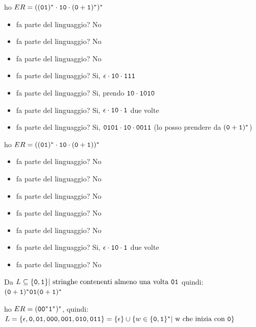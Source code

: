 \begin{example}
	ho $ER=((\mathtt{0}\mathtt{1})^*\cdot \mathtt{1}\mathtt{0}\cdot (\mathtt{0}+\mathtt{1})^*)^*$
	\begin{itemize}
		\item \zero\uno\zero\uno fa parte del linguaggio? No
		\item \zero\uno\zero\zero\zero fa parte del linguaggio? No
		\item \zero\uno\zero\uno\uno fa parte del linguaggio? No
		\item \uno\zero\uno\uno\uno fa parte del linguaggio? Si, $\epsilon\cdot \mathtt{1}\mathtt{0}\cdot \mathtt{1}\mathtt{1}\mathtt{1}$
		\item \uno\zero\uno\zero\uno\zero fa parte del linguaggio? Si, prendo $\mathtt{1}\mathtt{0}\cdot \mathtt{1}\mathtt{0}\mathtt{1}\mathtt{0}$
		\item \uno\zero\uno\uno\zero\uno fa parte del linguaggio? Si, $\epsilon\cdot \mathtt{1}\mathtt{0}\cdot \mathtt{1}$ due volte
		\item \zero\uno\zero\uno\uno\zero\zero\zero\uno\uno fa parte del linguaggio? Si, $\mathtt{0}\mathtt{1}\mathtt{0}\mathtt{1}\cdot \mathtt{1}\mathtt{0}\cdot \mathtt{0}\mathtt{0}\mathtt{1}\mathtt{1}$ (\zero\zero\uno\uno lo posso prendere da $(\mathtt{0}+\mathtt{1})^*$)
	\end{itemize}
\end{example}
\begin{example}
	ho $ER=((\mathtt{0}\mathtt{1})^*\cdot \mathtt{1}\mathtt{0}\cdot (\mathtt{0}+\mathtt{1}))^*$
	\begin{itemize}
		\item \zero\uno\zero\uno fa parte del linguaggio? No
		\item \zero\uno\zero\zero\zero fa parte del linguaggio? No
		\item \zero\uno\zero\uno\uno fa parte del linguaggio? No
		\item \uno\zero\uno\uno\uno fa parte del linguaggio? No
		\item \uno\zero\uno\zero\uno\zero fa parte del linguaggio? No
		\item \uno\zero\uno\uno\zero\uno fa parte del linguaggio? Si, $\epsilon\cdot \mathtt{1}\mathtt{0}\cdot \mathtt{1}$ due volte
		\item \zero\uno\zero\uno\uno\zero\zero\zero\uno\uno fa parte del linguaggio? No
	\end{itemize}
\end{example}
\begin{example}
	Da $L\subseteq\{\zero,\uno\}|\mbox{ stringhe contenenti almeno una volta \zero\uno}$
	quindi:
	$(\mathtt{0}+\mathtt{1})^*\mathtt{0}\mathtt{1}(\mathtt{0}+\mathtt{1})^*$
\end{example}
\begin{example}
	ho $ER=(\mathtt{0}\mathtt{0}^*\mathtt{1}^*)^*$, quindi:
	$L=\{\epsilon,\mathtt{0},\mathtt{0}\mathtt{1},\mathtt{0}\mathtt{0}\mathtt{0},\mathtt{0}\mathtt{0}\mathtt{1},\mathtt{0}\mathtt{1}\mathtt{0},\mathtt{0}\mathtt{1}\mathtt{1}\}=\{\epsilon\}\cup\{ w\in \{\mathtt{0},\mathtt{1}\}^* |\text{ w che inizia con \ensuremath{\mathtt{0}}}\}$
\end{example}


